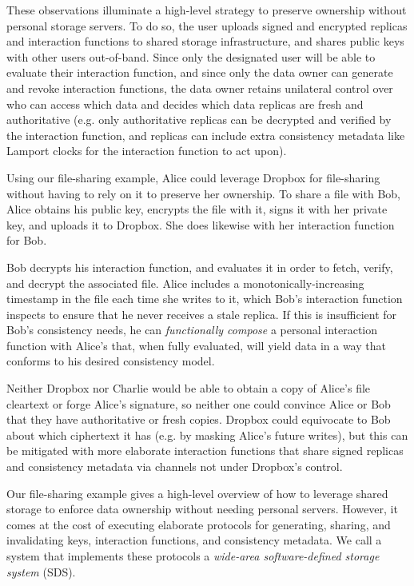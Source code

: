 These observations illuminate a high-level strategy to preserve ownership
without personal storage servers.  To do so, the user
uploads signed and encrypted replicas and interaction functions to shared
storage infrastructure, and shares public keys with other users out-of-band.
Since only the designated user
will be able to evaluate their interaction function, and since only the data owner
can generate and revoke interaction functions, the data owner retains unilateral
control over who can access which data and decides which data replicas are
fresh and authoritative (e.g. only authoritative replicas can be decrypted and
verified by the interaction function, and replicas can include extra consistency
metadata like Lamport clocks for the interaction function to act upon).

Using our file-sharing example, Alice could leverage Dropbox for file-sharing
without having to rely on it to preserve her ownership.  To
share a file with Bob, Alice obtains his public key, encrypts the file with
it, signs it with her private key, and uploads it to Dropbox.  She does likewise
with her interaction function for Bob.

Bob decrypts his interaction function,
and evaluates it in order to fetch, verify, and decrypt the associated file.
Alice includes a monotonically-increasing timestamp in the file each time she
writes to it, which Bob's interaction function inspects to ensure that he
never receives a stale replica.  If this is insufficient for Bob's consistency
needs, he can \emph{functionally compose} a
personal interaction function with Alice's that, when fully evaluated, will yield data in
a way that conforms to his desired consistency model.

Neither Dropbox nor Charlie would be able to obtain a
copy of Alice's file cleartext or forge Alice's signature, so neither one could
convince Alice or Bob that they have authoritative or fresh copies.  
Dropbox could equivocate to Bob about which ciphertext it has (e.g.
by masking Alice's future writes), but this can be mitigated with more
elaborate interaction functions that share signed replicas
and consistency metadata via channels not under Dropbox's control.

Our file-sharing example gives a high-level overview of how to leverage shared storage to enforce
data ownership without needing personal servers.  However, it comes at the cost
of executing elaborate protocols for generating, sharing, and invalidating keys,
interaction functions, and consistency metadata.  We call a system that implements
these protocols a \emph{wide-area software-defined storage system} (SDS).

